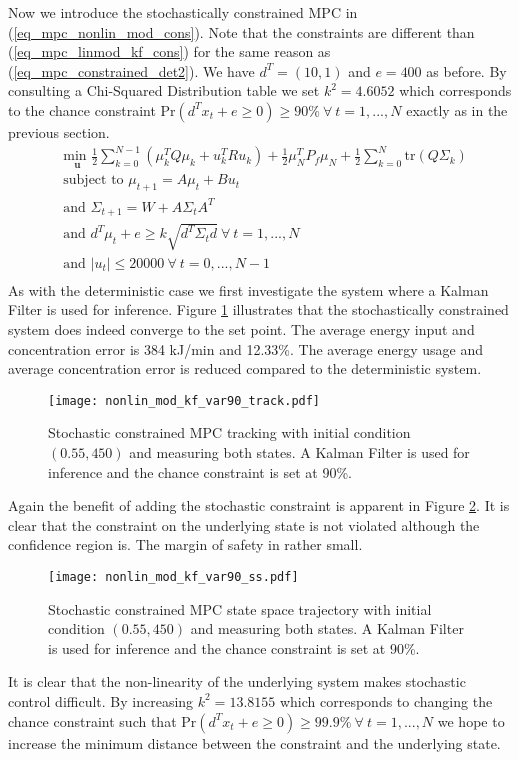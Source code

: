 Now we introduce the stochastically constrained MPC in (\ref{eq_mpc_nonlin_mod_cons}). Note that the constraints are different than (\ref{eq_mpc_linmod_kf_cons}) for the same reason as (\ref{eq_mpc_constrained_det2}). We have $d^T = (10, 1)$ and $e=400$ as before. By consulting a Chi-Squared Distribution table we set $k^2 = 4.6052$ which corresponds to the chance constraint $\text{Pr}(d^Tx_t + e \geq 0) \geq 90\% ~\forall ~t=1,...,N$ exactly as in the previous section.
\begin{equation}
\begin{aligned}
&\underset{\mathbf{u}}{\text{min }} \frac{1}{2}\sum_{k=0}^{N-1} \left( \mu_k^TQ\mu_k + u_k^TRu_k \right) + \frac{1}{2}\mu_N^TP_f\mu_N + \frac{1}{2}\sum_{k=0}^N \text{tr}(Q\Sigma_k) \\
& \text{subject to } \mu_{t+1}=A\mu_t + Bu_t \\
& \text{and } \Sigma_{t+1} = W+A\Sigma_t A^T \\
& \text{and } d^T\mu_t + e \geq k\sqrt{d^T \Sigma_t d} ~\forall ~t=1,...,N\\
& \text{and } |u_t| \leq 20000 ~\forall ~t=0,...,N-1\\
\end{aligned}
\label{eq_mpc_nonlin_mod_cons}
\end{equation}
As with the deterministic case we first investigate the system where a Kalman Filter is used for inference. Figure \ref{fig_nonlin_mod_kf_var90_track} illustrates that the stochastically constrained system does indeed converge to the set point. The average energy input and concentration error is 384 kJ/min and 12.33\%. The average energy usage and average concentration error is reduced compared to the deterministic system. 
\begin{figure}[H] 
\centering
\texttt{[image: nonlin\_mod\_kf\_var90\_track.pdf]}
\caption{Stochastic constrained MPC tracking with initial condition $(0.55, 450)$ and measuring both states. A Kalman Filter is used for inference and the chance constraint is set at 90\%.}
\label{fig_nonlin_mod_kf_var90_track}
\end{figure}
Again the benefit of adding the stochastic constraint is apparent in Figure \ref{fig_nonlin_mod_kf_var90_ss}. It is clear that the constraint on the underlying state is not violated although the confidence region is. The margin of safety in rather small. 
\begin{figure}[H] 
\centering
\texttt{[image: nonlin\_mod\_kf\_var90\_ss.pdf]}
\caption{Stochastic constrained MPC state space trajectory with initial condition $(0.55, 450)$ and measuring both states. A Kalman Filter is used for inference and the chance constraint is set at 90\%.}
\label{fig_nonlin_mod_kf_var90_ss}
\end{figure}
It is clear that the non-linearity of the underlying system makes stochastic control difficult. By increasing $k^2=13.8155$ which corresponds to changing the chance constraint such that $\text{Pr}(d^Tx_t + e \geq 0) \geq 99.9\% ~\forall ~t=1,...,N$ we hope to increase the minimum distance between the constraint and the underlying state.

